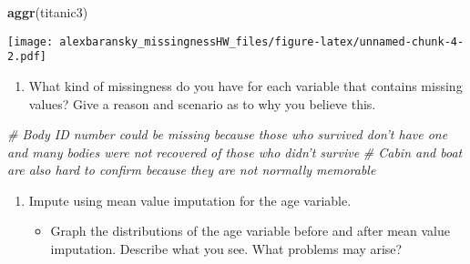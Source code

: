 \documentclass[]{article}
\newenvironment{Shaded}{\begin{snugshade}}{\end{snugshade}}
\newcommand{\KeywordTok}[1]{\textcolor[rgb]{0.13,0.29,0.53}{\textbf{#1}}}
\newcommand{\StringTok}[1]{\textcolor[rgb]{0.31,0.60,0.02}{#1}}
\newcommand{\CommentTok}[1]{\textcolor[rgb]{0.56,0.35,0.01}{\textit{#1}}}
\newcommand{\OperatorTok}[1]{\textcolor[rgb]{0.81,0.36,0.00}{\textbf{#1}}}
\newcommand{\NormalTok}[1]{#1}
\providecommand{\tightlist}{%
  \setlength{\itemsep}{0pt}\setlength{\parskip}{0pt}}
\begin{document}
\begin{Shaded}
\begin{Highlighting}[]
\KeywordTok{aggr}\NormalTok{(titanic3)}
\end{Highlighting}
\end{Shaded}

\texttt{[image: alexbaransky\_missingnessHW\_files/figure-latex/unnamed-chunk-4-2.pdf]}

\begin{enumerate}
\def\labelenumi{\arabic{enumi}.}
\setcounter{enumi}{4}
\tightlist
\item
  What kind of missingness do you have for each variable that contains
  missing values? Give a reason and scenario as to why you believe this.
\end{enumerate}

\begin{Shaded}
\begin{Highlighting}[]
\CommentTok{# Body ID number could be missing because those who survived don't have one and many bodies were not recovered of those who didn't survive}
\CommentTok{# Cabin and boat are also hard to confirm because they are not normally memorable}
\end{Highlighting}
\end{Shaded}

\begin{enumerate}
\def\labelenumi{\arabic{enumi}.}
\setcounter{enumi}{5}
\tightlist
\item
  Impute using mean value imputation for the age variable.

  \begin{itemize}
  \tightlist
  \item
    Graph the distributions of the age variable before and after mean
    value imputation. Describe what you see. What problems may arise?
  \end{itemize}
\end{enumerate}

\begin{Shaded}
\end{Shaded}
\end{document}

